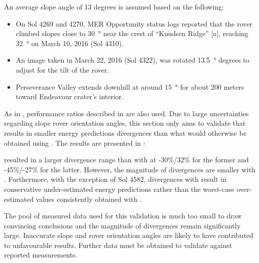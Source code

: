 An average slope angle of 13 degrees is assumed based on the following:
\begin{itemize}
  \item On Sol 4269 and 4270, \ac{MER} Opportunity status logs reported that the rover climbed slopes close to \SI{30}{\degree} near the crest of ``Knudsen Ridge'' [a], reaching \SI{32}{\degree} on March 10, 2016 (Sol 4310).
  \item An image taken in March 22, 2016 (Sol 4322), was rotated \SI{13.5}{\degree} degrees to adjust for the tilt of the rover.
  \item Perseverance Valley extends downhill at around \SI{15}{\degree} for about 200 meters toward Endeavour crater's interior.
\end{itemize}

As in , performance ratios described in  are also used. Due to large uncertainties regarding slope rover orientation angles, this section only aims to validate that  results in smaller energy predictions divergences than what would otherwise be obtained using . The results are presented in :



 resulted in a larger divergence range than with  at -30\%/32\% for the former and -45\%/-27\% for the latter. However, the magnitude of divergences are smaller with . Furthermore, with the exception of Sol 4582, divergences with  result in conservative under-estimated energy predictions rather than the worst-case over-estimated values consistently obtained with .

The pool of measured data used for this validation is much too small to draw convincing conclusions and the magnitude of divergences remain significantly large. Inaccurate slope and rover orientation angles are likely to have contributed to unfavourable results. Further data must be obtained to validate  against reported measurements. %

